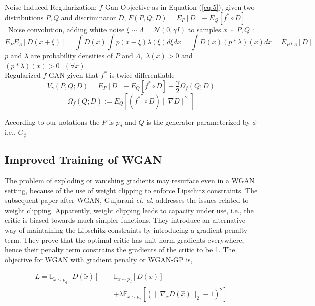 Noise Induced Regularization: $f$-Gan Objective as in Equation (\ref{eq:5}), given two distributions $P,Q$ and discriminator $D$, $F(P,Q;D) = E_{P}[D] - E_{Q}[f^* \circ D] \ $ \ 
Noise convolution, adding white noise $\xi \sim \Lambda = \mathcal{N}(0, \gamma I)$ to samples $x \sim P, Q$ :
\begin{dmath*}
E_{P}E_{\Lambda}[D(x + \xi)] = \int
D(x) \int p(x - \xi) \lambda(\xi)d\xi dx = \int D(x)(p*\lambda)(x)dx = E_{P*\Lambda}[D]
\end{dmath*} 
$p$ and $\lambda$ are probability densities of $P$ and $\Lambda,$ $\lambda(x)>0$ and $(p*\lambda)(x) > 0\mbox{ }(\forall x)$.\\
Regularized $f$-GAN given that $f^*$ is twice differentiable $$V_{\gamma}(P, Q; D) = E_{P}[D] - E_{Q}[f^* \circ D] - \frac{\gamma}{2} \Omega_{f}(Q;D)$$ $$\Omega_{f}(Q;D) := E_{Q}[({f^*}^{''} \circ D) \parallel \nabla D \parallel^2] $$

According to our notations the $P$ is $p_d$ and $Q$ is the generator parameterized by $\phi$ i.e., $G_{\phi}$

\subsection*{Improved Training of WGAN \citep{gularajani}}
The problem of exploding or vanishing gradients may resurface even in a WGAN setting, because of the use of weight clipping to enforce Lipschitz constraints. The subsequent paper after WGAN, Guljarani \emph{et. al.} \citep{gularajani} addresses the issues related to weight clipping. Apparently, weight clipping leads to capacity under use, i.e., the critic is biased towards much simpler functions. They introduce an alternative way of maintaining the Lipschitz constraints by introducing a gradient penalty term. They prove that the optimal critic has unit norm gradients everywhere, hence their penalty term constrains the gradients of the critic to be 1. The objective for WGAN with gradient penalty or WGAN-GP is,

\begin{equation}
\label{eq:wgan_gp}
    \begin{aligned}
        L = \mathbb{E}_{\tilde{x}\sim p_{g}}[D(\tilde{x})] - &  \mathbb{E}_{x\sim p_{d}}[D(x)] \\
        & + \lambda\mathbb{E}_{\hat{x}\sim p_{\hat{x}}}[(\parallel\nabla_{\hat{x}}D(\hat{x}) \parallel_{2} - 1)^2]
    \end{aligned}{}
\end{equation}{}

